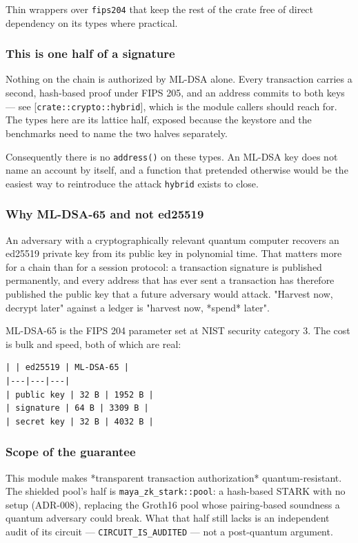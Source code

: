 \documentclass[11pt,a4paper]{article}
\begin{document}
Thin wrappers over \texttt{fips204} that keep the rest of the crate free of direct
dependency on its types where practical.

\subsubsection{This is one half of a signature}

Nothing on the chain is authorized by ML-DSA alone. Every transaction
carries a second, hash-based proof under FIPS 205, and an address commits to
both keys — see [\texttt{crate::crypto::hybrid}], which is the module callers
should reach for. The types here are its lattice half, exposed because the
keystore and the benchmarks need to name the two halves separately.

Consequently there is no \texttt{address()} on these types. An ML-DSA key does not
name an account by itself, and a function that pretended otherwise would be
the easiest way to reintroduce the attack \texttt{hybrid} exists to close.

\subsubsection{Why ML-DSA-65 and not ed25519}

An adversary with a cryptographically relevant quantum computer recovers an
ed25519 private key from its public key in polynomial time. That matters more
for a chain than for a session protocol: a transaction signature is published
permanently, and every address that has ever sent a transaction has therefore
published the public key that a future adversary would attack. "Harvest now,
decrypt later" against a ledger is "harvest now, *spend* later".

ML-DSA-65 is the FIPS 204 parameter set at NIST security category 3. The cost
is bulk and speed, both of which are real:

\begin{verbatim}
| | ed25519 | ML-DSA-65 |
|---|---|---|
| public key | 32 B | 1952 B |
| signature | 64 B | 3309 B |
| secret key | 32 B | 4032 B |
\end{verbatim}

\subsubsection{Scope of the guarantee}

This module makes *transparent transaction authorization* quantum-resistant.
The shielded pool's half is \texttt{maya\_zk\_stark::pool}: a hash-based STARK with no
setup (ADR-008), replacing the Groth16 pool whose pairing-based soundness a
quantum adversary could break. What that half still lacks is an independent
audit of its circuit — \texttt{CIRCUIT\_IS\_AUDITED} — not a post-quantum argument.
\end{document}
